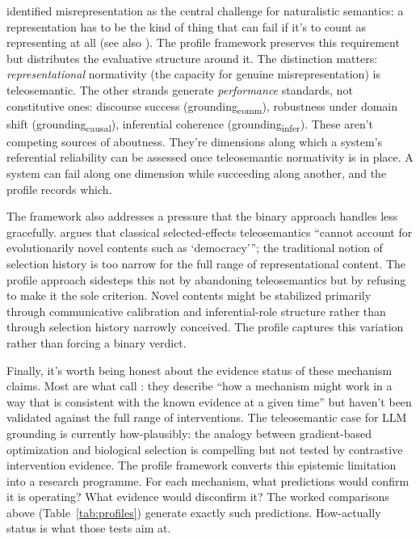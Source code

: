 \documentclass[12pt]{article}
\newcommand{\gcausal}{grounding\textsubscript{causal}}
\newcommand{\gcomm}{grounding\textsubscript{comm}}
\newcommand{\ginfer}{grounding\textsubscript{infer}}
\begin{document}
\textcite{millikan_1990_compare_contrast_teleosemantics} identified misrepresentation as the central challenge for naturalistic semantics: a representation has to be the kind of thing that can fail if it's to count as representing at all (see also \citealt{neander_2017_mark_of_mental}). The profile framework preserves this requirement but distributes the evaluative structure around it. The distinction matters: \emph{representational} normativity (the capacity for genuine misrepresentation) is teleosemantic. The other strands generate \emph{performance} standards, not constitutive ones: discourse success (\gcomm{}), robustness under domain shift (\gcausal{}), inferential coherence (\ginfer{}). These aren't competing sources of aboutness. They're dimensions along which a system's referential reliability can be assessed once teleosemantic normativity is in place. A system can fail along one dimension while succeeding along another, and the profile records which.

The framework also addresses a pressure that the binary approach handles less gracefully. \textcite[1]{roloff_2025_indispensability_proper_functions} argues that classical selected-effects teleosemantics \enquote{cannot account for evolutionarily novel contents such as `democracy'}; the traditional notion of selection history is too narrow for the full range of representational content. The profile approach sidesteps this not by abandoning teleosemantics but by refusing to make it the sole criterion. Novel contents might be stabilized primarily through communicative calibration and inferential-role structure rather than through selection history narrowly conceived. The profile captures this variation rather than forcing a binary verdict.

Finally, it's worth being honest about the evidence status of these mechanism claims. Most are what \textcite[95]{craver_darden_2013_in_search_of_mechanisms} call : they describe \enquote{how a mechanism might work in a way that is consistent with the known evidence at a given time} but haven't been validated against the full range of interventions. The teleosemantic case for LLM grounding is currently how-plausibly: the analogy between gradient-based optimization and biological selection is compelling but not tested by contrastive intervention evidence. The profile framework converts this epistemic limitation into a research programme. For each mechanism, what predictions would confirm it is operating? What evidence would disconfirm it? The worked comparisons above (Table~\ref{tab:profiles}) generate exactly such predictions. How-actually status is what those tests aim at.
\end{document}
